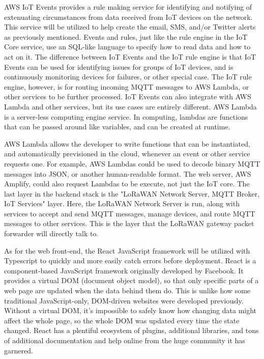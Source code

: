 AWS IoT Events provides a rule making service for identifying and notifying of extenuating
circumstances from data received from IoT devices on the network. This service will be utilized to
help create the email, SMS, and/or Twitter alerts as previously mentioned. Events and rules, just
like the rule engine in the IoT Core service, use an SQL-like language to specify how to read data
and how to act on it. The difference between IoT Events and the IoT rule engine is that IoT Events
can be used for identifying issues for groups of IoT devices, and is continuously monitoring devices
for failures, or other special case. The IoT rule engine, however, is for routing incoming MQTT
messages to AWS Lambda, or other services to be further processed. IoT Events can also integrate
with AWS Lambda and other services, but its use cases are entirely different. AWS Lambda is
a server-less computing engine service. In computing, lambdas are functions that can be passed
around like variables, and can be created at runtime.

AWS Lambda allows the developer to write functions that can be instantiated, and automatically
previsioned in the cloud, whenever an event or other service requests one. For example, AWS Lambdas
could be used to decode binary MQTT messages into JSON, or another human-readable format. The web
server, AWS Amplify, could also request Lambdas to be execute, not just the IoT core. The last layer
in the backend stack is the "LoRaWAN Network Server, MQTT Broker, IoT Services" layer. Here, the
LoRaWAN Network Server is run, along with services to accept and send MQTT messages, manage devices,
and route MQTT messages to other services. This is the layer that the LoRaWAN gateway packet
forwarder will directly talk to.

As for the web front-end, the React JavaScript framework will be utilized with Typescript to quickly
and more easily catch errors before deployment. React is a component-based JavaScript framework
originally developed by Facebook. It provides a virtual DOM (document object model), so that only
specific parts of a web page are updated when the data behind them do. This is unlike how some
traditional JavaScript-only, DOM-driven websites were developed previously. Without a virtual DOM,
it's impossible to safely know how changing data might affect the whole page, so the whole DOM was
updated every time the state changed. React has a plentiful ecosystem of plugins, additional
libraries, and tons of additional documentation and help online from the huge community it has
garnered.

